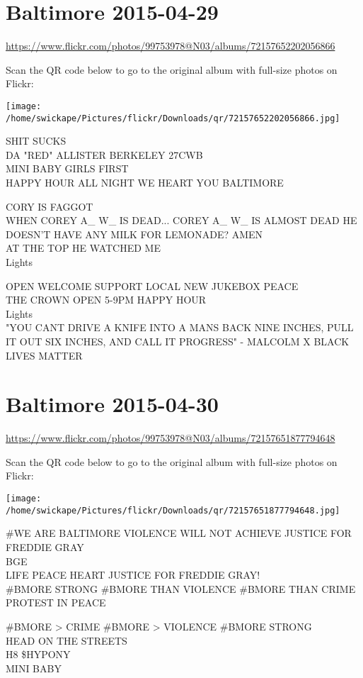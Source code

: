 \documentclass[10pt,letterpaper]{article}
\begin{document}
\section*{Baltimore 2015-04-29}

\url{https://www.flickr.com/photos/99753978@N03/albums/72157652202056866}

Scan the QR code below to go to the original album with full-size photos on Flickr:

\texttt{[image: /home/swickape/Pictures/flickr/Downloads/qr/72157652202056866.jpg]}


SHIT SUCKS\\
DA "RED" ALLISTER BERKELEY 27CWB\\
MINI BABY GIRLS FIRST\\
HAPPY HOUR ALL NIGHT WE HEART YOU BALTIMORE

CORY IS FAGGOT\\
WHEN COREY A\_ W\_ IS DEAD...  COREY A\_ W\_ IS ALMOST DEAD HE DOESN'T HAVE ANY MILK FOR LEMONADE?  AMEN\\
AT THE TOP HE WATCHED ME\\
Lights

OPEN WELCOME SUPPORT LOCAL NEW JUKEBOX PEACE\\
THE CROWN OPEN 5{-}9PM HAPPY HOUR\\
Lights\\
"YOU CANT DRIVE A KNIFE INTO A MANS BACK NINE INCHES, PULL IT OUT SIX INCHES, AND CALL IT PROGRESS" {-} MALCOLM X BLACK LIVES MATTER


\section*{Baltimore 2015-04-30}

\url{https://www.flickr.com/photos/99753978@N03/albums/72157651877794648}

Scan the QR code below to go to the original album with full-size photos on Flickr:

\texttt{[image: /home/swickape/Pictures/flickr/Downloads/qr/72157651877794648.jpg]}


\#WE ARE BALTIMORE VIOLENCE WILL NOT ACHIEVE JUSTICE FOR FREDDIE GRAY\\
BGE\\
LIFE PEACE HEART JUSTICE FOR FREDDIE GRAY!\\
\#BMORE STRONG \#BMORE THAN VIOLENCE \#BMORE THAN CRIME PROTEST IN PEACE

\#BMORE > CRIME \#BMORE > VIOLENCE \#BMORE STRONG\\
HEAD ON THE STREETS\\
H8 \$HYPONY\\
MINI BABY
\end{document}
